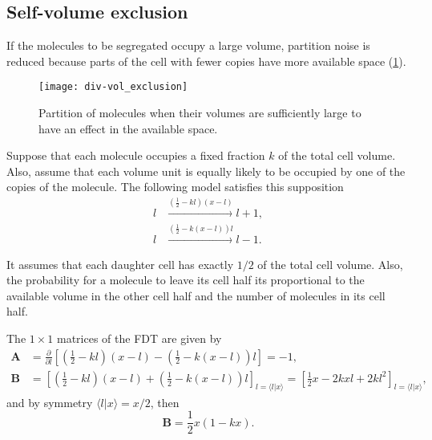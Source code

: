 \subsection{Self-volume exclusion}

If the molecules to be segregated occupy a large volume, partition noise is reduced because parts of the cell with fewer copies have more available space (\ref{fig:div-vol_exclusion}).
\begin{figure}[H]
  \centering
  \texttt{[image: div-vol\_exclusion]}
  \caption[Partition with size exclusion]{\label{fig:div-vol_exclusion} Partition of molecules when their volumes are sufficiently large to have an effect in the available space.}
\end{figure}

Suppose that each molecule occupies a fixed fraction $k$ of the total cell volume. Also, assume that each volume unit is equally likely to be occupied by one of the copies of the molecule. The following model satisfies this supposition
\begin{equation*}
  \begin{split}
  l&\xrightarrow{(\frac{1}{2}-kl)(x-l)}l+1,\\
  l&\xrightarrow{(\frac{1}{2}-k(x-l))l}l-1.
  \end{split}
\end{equation*}

It assumes that each daughter cell has exactly $1/2$ of the total cell volume. Also, the probability for a molecule to leave its cell half its proportional to the available volume in the other cell half and the number of molecules in its cell half.

The $1\times 1$ matrices of the FDT are given by
\begin{equation*}
  \begin{split}
  \mathbf{A}&=\frac{\partial}{\partial l}\left[\left(\frac{1}{2}-kl\right)\left(x-l\right)-\left(\frac{1}{2}-k\left(x-l\right)\right)l\right]=-1,\\
  \mathbf{B}&=\left[\left(\frac{1}{2}-kl\right)\left(x-l\right)+\left(\frac{1}{2}-k\left(x-l\right)\right)l\right]_{l=\langle l|x\rangle} = \left[\frac{1}{2}x-2kxl+2kl^2\right]_{l=\langle l|x\rangle},
  \end{split}
\end{equation*}
and by symmetry $\langle l|x\rangle = x/2$, then
\begin{equation*}
  \mathbf{B} = \frac{1}{2}x(1-kx).
\end{equation*}

